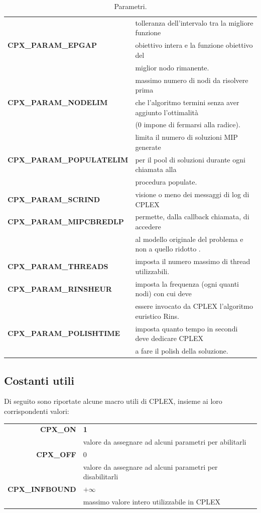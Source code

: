 \begin{table}[h]
\centering\footnotesize
\begin{tabular}{|l|l|}
\hline
\multirow{3}{*}{\textbf{CPX\_PARAM\_EPGAP}} & {tolleranza dell'intervalo tra la migliore funzione }\\
& {obiettivo intera e la funzione obiettivo del}\\
& {miglior nodo rimanente.}\\
\hline
\multirow{3}{*}{\textbf{CPX\_PARAM\_NODELIM}} & {massimo numero di nodi da risolvere prima}\\
& {che l'algoritmo termini senza aver aggiunto l'ottimalità}\\
& {(0 impone di fermarsi alla radice).}\\
\hline
\multirow{3}{*}{\textbf{CPX\_PARAM\_POPULATELIM}} & {limita il numero di soluzioni MIP generate }\\
& {per il pool di soluzioni durante ogni chiamata alla}\\
&{procedura populate.}\\
\hline
\textbf{CPX\_PARAM\_SCRIND} & {visione o meno dei messaggi di log di CPLEX}\\
\hline
\textbf{CPX\_PARAM\_MIPCBREDLP} & {permette, dalla callback chiamata, di accedere  }\\
&{al modello originale del problema e non a quello ridotto .}\\
\hline
\textbf{CPX\_PARAM\_THREADS} & {imposta il numero massimo di thread utilizzabili. }\\
\hline
\textbf{CPX\_PARAM\_RINSHEUR} & {imposta la frequenza (ogni quanti nodi) con cui deve}\\
&{essere invocato da CPLEX l'algoritmo euristico Rins.}\\
\hline
\textbf{CPX\_PARAM\_POLISHTIME} & {imposta quanto tempo in secondi deve dedicare CPLEX}\\
&{a fare il polish della soluzione.}\\
\hline
\end{tabular}
\caption{Parametri.}\label{param_table}
\end{table}
\subsection{Costanti utili}
Di seguito sono riportate alcune macro utili di CPLEX, insieme ai loro corrispondenti valori:
\begin{table}[h]
\footnotesize\centering
\begin{tabular}{|r|l|}
\hline
\textbf{CPX\_ON} & {\textbf{1}}\\
{} & {valore da assegnare ad alcuni parametri per abilitarli}\\
\hline
\textbf{CPX\_OFF} & {0}\\
{} & {valore da assegnare ad alcuni parametri per disabilitarli}\\
\hline
\textbf{CPX\_INFBOUND} & {$+\infty$}\\
{} & {massimo valore intero utilizzabile in CPLEX}\\
\hline
\end{tabular}
\end{table}

